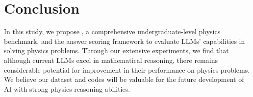 \section{Conclusion}\label{sec: conclusion}

In this study, we propose {\benchmark}, a comprehensive undergraduate-level physics benchmark, and the {\judge} answer scoring framework to evaluate LLMs' capabilities in solving physics problems.
Through our extensive experiments, we find that although current LLMs excel in mathematical reasoning, there remains considerable potential for improvement in their performance on physics problems.
We believe our dataset and codes will be valuable for the future development of AI with strong physics reasoning abilities.